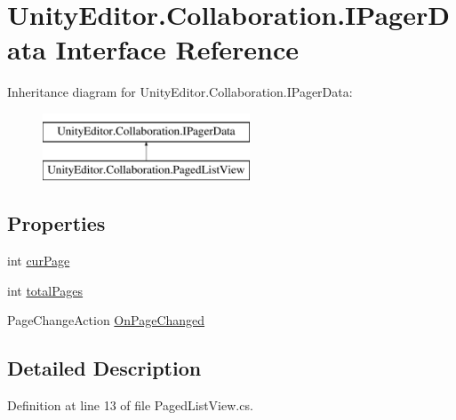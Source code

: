 \hypertarget{interface_unity_editor_1_1_collaboration_1_1_i_pager_data}{}\section{Unity\+Editor.\+Collaboration.\+I\+Pager\+Data Interface Reference}
\label{interface_unity_editor_1_1_collaboration_1_1_i_pager_data}
Inheritance diagram for Unity\+Editor.\+Collaboration.\+I\+Pager\+Data\+:\begin{figure}[H]
\begin{center}
\leavevmode
\includegraphics[height=2.000000cm]{interface_unity_editor_1_1_collaboration_1_1_i_pager_data}
\end{center}
\end{figure}
\subsection*{Properties}
\begin{DoxyCompactItemize}
\item 
int \mbox{\hyperlink{interface_unity_editor_1_1_collaboration_1_1_i_pager_data_a9d25f02aaec8260a36c4ced233afa4ab}{cur\+Page}}
\item 
int \mbox{\hyperlink{interface_unity_editor_1_1_collaboration_1_1_i_pager_data_afc60442c69cacf2b613e4ff00caaec74}{total\+Pages}}
\item 
Page\+Change\+Action \mbox{\hyperlink{interface_unity_editor_1_1_collaboration_1_1_i_pager_data_a74eb565f959227261f6fe6539e602475}{On\+Page\+Changed}}
\end{DoxyCompactItemize}


\subsection{Detailed Description}


Definition at line 13 of file Paged\+List\+View.\+cs.



